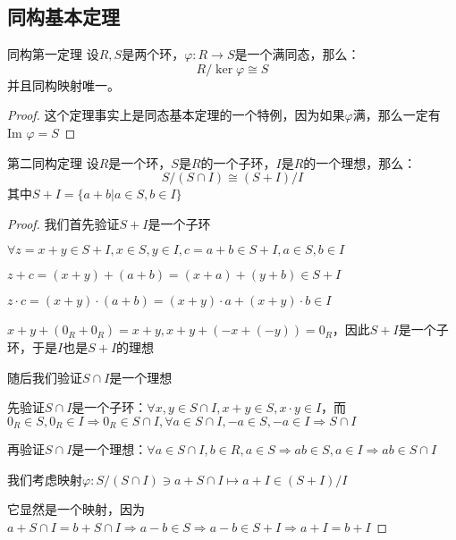 \documentclass[12pt, a4paper, oneside, UTF8]{ctexbook}
\begin{document}
		\subsection{同构基本定理}
		\begin{para}{0}
				\begin{them}{同构第一定理}{}
					设$R,S$是两个环，$\varphi : R \rightarrow S$是一个满同态，那么：
					\begin{equation}
						R / \ker \varphi \cong S
					\end{equation}
					并且同构映射唯一。
				\end{them}
				\begin{proof}
					这个定理事实上是同态基本定理的一个特例，因为如果$\varphi $满，那么一定有$\text{Im }\varphi = S$
				\end{proof}
				\begin{them}{第二同构定理}{}
					设$R$是一个环，$S$是$R$的一个子环，$I$是$R$的一个理想，那么：
					\begin{equation}
						S / (S \cap I) \cong (S+I) / I
					\end{equation}
					其中$S+I=\{a+b| a \in S,b \in I\}$
				\end{them}
				\begin{proof}
					我们首先验证$S+I$是一个子环

					$\forall z=x+y\in S+I,x \in S,y\in I,c=a+b \in S+I,a \in S,b \in I$

					$z+c=(x+y)+(a+b)=(x+a)+(y+b) \in S+I$
					
					$z\cdot c=(x+y)\cdot (a+b)=(x+y)\cdot a+(x+y)\cdot b\in I$

					$x+y+(0_R+0_R)=x+y,x+y+\left(-x+(-y)\right)=0_R$，因此$S+I$是一个子环，于是$I$也是$S+I$的理想
					
					随后我们验证$S\cap I$是一个理想

					先验证$S\cap I$是一个子环：$\forall x,y \in S\cap I,x+y \in S,x\cdot y \in I$，而$0_R\in S,0_R \in I \Rightarrow 0_R \in S\cap I,\forall a \in S\cap I,-a \in S,-a \in I \Rightarrow S\cap I$

					再验证$S\cap I$是一个理想：$\forall a \in S\cap I,b \in R,a\in S \Rightarrow ab \in S,a\in I \Rightarrow ab \in S\cap I$

					我们考虑映射$\varphi : S/(S \cap I) \ni a + S\cap I \mapsto a+I \in (S+I)/I$

					它显然是一个映射，因为$a+ S\cap I=b+S\cap I \Rightarrow a-b \in S \Rightarrow a-b \in S+I \Rightarrow a+I=b+I$
					

\end{proof}
\end{para}
\end{document}
